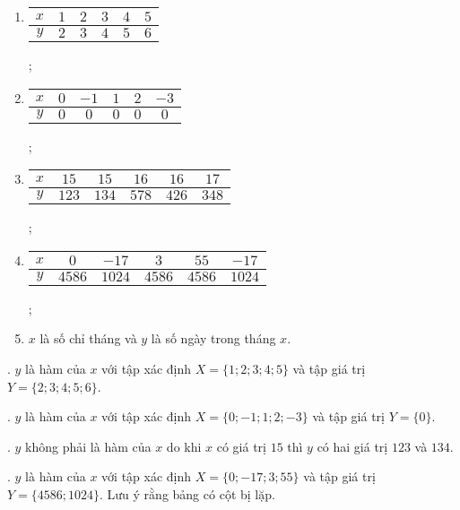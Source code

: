 \begin{enumerate}
   \item \begin{tabular}{|c|c|c|c|c|c|}
      \hline
      $x$ & $1$ & $2$ & $3$ & $4$ & $5$ \\
      \hline
      $y$ & $2$ & $3$ & $4$ & $5$ & $6$ \\
      \hline
   \end{tabular};
   \item \begin{tabular}{|c|c|c|c|c|c|}
      \hline
      $x$ & $0$ & $-1$ & $1$ & $2$ & $-3$ \\
      \hline
      $y$ & $0$ & $0$ & $0$ & $0$ & $0$ \\
      \hline
   \end{tabular};
   \item \begin{tabular}{|c|c|c|c|c|c|}
      \hline
      $x$ & $15$ & $15$ & $16$ & $16$ & $17$ \\
      \hline
      $y$ & $123$ & $134$ & $578$ & $426$ & $348$ \\
      \hline
   \end{tabular};
   \item \begin{tabular}{|c|c|c|c|c|c|}
      \hline
      $x$ & $0$ & $-17$ & $3$ & $55$ & $-17$ \\
      \hline
      $y$ & $4586$ & $1024$ & $4586$ & $4586$ & $1024$ \\
      \hline
   \end{tabular};
   \item $x$ là số chỉ tháng và $y$ là số ngày trong tháng $x$.
\end{enumerate}

\solution

\setcounter{subexercise}{1}
. $y$ là hàm của $x$ với tập xác định $X = \{1; 2; 3; 4; 5\}$ và tập giá trị $Y = \{2; 3; 4; 5; 6\}$.

. $y$ là hàm của $x$ với tập xác định $X = \{0; -1; 1; 2; -3\}$ và tập giá trị $Y = \{0\}$.

. $y$ không phải là hàm của $x$ do khi $x$ có giá trị $15$ thì $y$ có hai giá trị $123$ và $134$.

. $y$ là hàm của $x$ với tập xác định $X = \{0; -17; 3; 55\}$ và tập giá trị $Y = \{4586; 1024\}$. Lưu ý rằng bảng có cột bị lặp.

